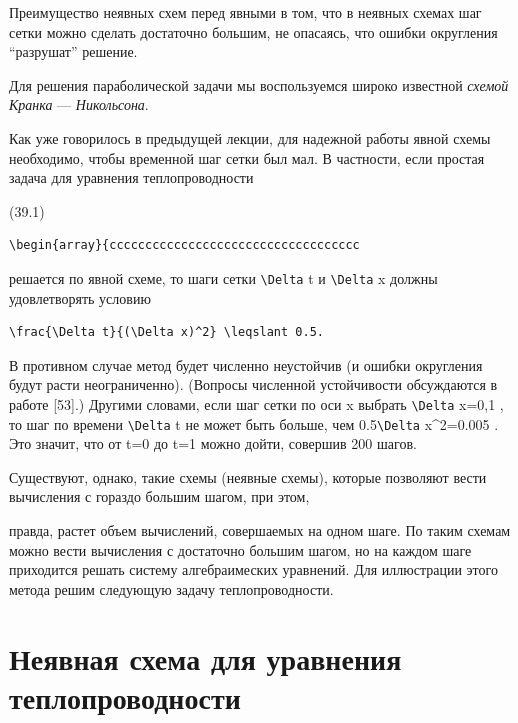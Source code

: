 \documentclass[
  ukrainian,
]{article}
\begin{document}
Преимущество неявных схем перед явными в том, что в неявных схемах шаг
сетки можно сделать достаточно большим, не опасаясь, что ошибки
округления ``разрушат'' решение.

Для решения параболической задачи мы воспользуемся широко известной
\emph{схемой Кранка} --- \emph{Никольсона}.

Как уже говорилось в предыдущей лекции, для надежной работы явной схемы
необходимо, чтобы временной шаг сетки был мал. В частности, если простая
задача для уравнения теплопроводности

(39.1)

\begin{verbatim}
\begin{array}{ccccccccccccccccccccccccccccccccccc
\end{verbatim}

решается по явной схеме, то шаги сетки \texttt{\textbackslash{}Delta} t
и \texttt{\textbackslash{}Delta} x должны удовлетворять условию

\begin{verbatim}
\frac{\Delta t}{(\Delta x)^2} \leqslant 0.5.
\end{verbatim}

В противном случае метод будет численно неустойчив (и ошибки округления
будут расти неограниченно). (Вопросы численной устойчивости обсуждаются
в работе {[}53{]}.) Другими словами, если шаг сетки по оси x выбрать
\texttt{\textbackslash{}Delta} x=0,1 , то шаг по времени
\texttt{\textbackslash{}Delta} t не может быть больше, чем
0.5\texttt{\textbackslash{}Delta} x\^{}2=0.005 . Это значит, что от t=0
до t=1 можно дойти, совершив 200 шагов.

Существуют, однако, такие схемы (неявные схемы), которые позволяют вести
вычисления с гораздо большим шагом, при этом,

правда, растет объем вычислений, совершаемых на одном шаге. По таким
схемам можно вести вычисления с достаточно большим шагом, но на каждом
шаге приходится решать систему алгебраимеских уравнений. Для иллюстрации
этого метода решим следующую задачу теплопроводности.

\section{Неявная схема для уравнения
теплопроводности}\label{ux43dux435ux44fux432ux43dux430ux44f-ux441ux445ux435ux43cux430-ux434ux43bux44f-ux443ux440ux430ux432ux43dux435ux43dux438ux44f-ux442ux435ux43fux43bux43eux43fux440ux43eux432ux43eux434ux43dux43eux441ux442ux438}
\end{document}
